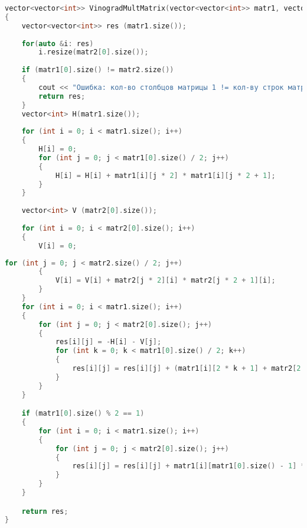         \begin{lstlisting}[language=C++, label=lst:mult:Vinograd, caption=Алгоритм Винограда без оптимизации]
vector<vector<int>> VinogradMultMatrix(vector<vector<int>> matr1, vector<vector<int>> matr2)
{
    vector<vector<int>> res (matr1.size());
    
    for(auto &i: res)
        i.resize(matr2[0].size());
    
    if (matr1[0].size() != matr2.size())
    {
        cout << "Ошибка: кол-во столбцов матрицы 1 != кол-ву строк матрицы 2" << endl;
        return res;
    }
    vector<int> H(matr1.size());
    
    for (int i = 0; i < matr1.size(); i++)
    {
        H[i] = 0;
        for (int j = 0; j < matr1[0].size() / 2; j++)
        {
            H[i] = H[i] + matr1[i][j * 2] * matr1[i][j * 2 + 1];
        }
    }
    
    vector<int> V (matr2[0].size());
    
    for (int i = 0; i < matr2[0].size(); i++)
    {
        V[i] = 0;
        \end{lstlisting}
        \begin{lstlisting}[language=C++, label=lst:mult:Vinograd_1, caption=Алгоритм Винограда без оптимизации]
        for (int j = 0; j < matr2.size() / 2; j++)
        {
            V[i] = V[i] + matr2[j * 2][i] * matr2[j * 2 + 1][i];
        }
    }
    for (int i = 0; i < matr1.size(); i++)
    {
        for (int j = 0; j < matr2[0].size(); j++)
        {
            res[i][j] = -H[i] - V[j];
            for (int k = 0; k < matr1[0].size() / 2; k++)
            {
                res[i][j] = res[i][j] + (matr1[i][2 * k + 1] + matr2[2 * k][j]) * (matr1[i][2 * k] + matr2[2 * k + 1][j]);
            }
        }
    }

    if (matr1[0].size() % 2 == 1)
    {
        for (int i = 0; i < matr1.size(); i++)
        {
            for (int j = 0; j < matr2[0].size(); j++)
            {
                res[i][j] = res[i][j] + matr1[i][matr1[0].size() - 1] * matr2[matr1[0].size() - 1][j];
            }
        }
    }

    return res;
}
        \end{lstlisting}

